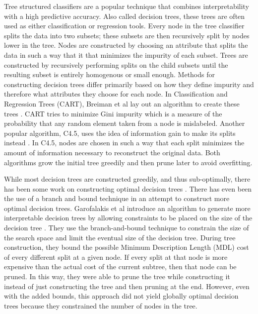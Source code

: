 \documentclass[]{report}
\theoremstyle{definition}
\begin{document}
Tree structured classifiers are a popular technique that combines interpretability with a high predictive accuracy.
Also called decision trees, these trees are often used as either classification or regression tools.
Every node in the tree classifier splits the data into two subsets; these subsets are then recursively split by nodes lower in the tree.
Nodes are constructed by choosing an attribute that splits the data in such a way that it that minimizes the impurity of each subset.
Trees are constructed by recursively performing splits on the child subsets until the resulting subset is entirely homogenous or small enough.
Methods for constructing decision trees differ primarily based on how they define impurity and therefore what attributes they choose for each node.
In Classification and Regression Trees (CART), Breiman et al lay out an algorithm to create these trees \cite{BreimanFrOlSt84}.
CART tries to minimize Gini impurity which is a measure of the probability that any random element taken from a node is mislabeled.
Another popular algorithm, C4.5, uses the idea of information gain to make its splits instead \cite{Quinlan93}.
In C4.5, nodes are chosen in such a way that each split minimizes the amount of information necessary to reconstruct the original data.
Both algorithms grow the initial tree greedily and then prune later to avoid overfitting.

While most decision trees are constructed greedily, and thus sub-optimally, there has been some work on constructing optimal decision trees \cite{Moret82}.
There has even been the use of a branch and bound technique in an attempt to construct more optimal decision trees.
Garofalakis et al introduce an algorithm to generate more interpretable decision trees by allowing constraints to be placed on the size of the decision tree \cite{GarofalakisHyRaSh00}.
They use the branch-and-bound technique to constrain the size of the search space and limit the eventual size of the decision tree.
During tree construction, they bound the possible Minimum Description Length (MDL) cost of every different split at a given node.
If every split at that node is more expensive than the actual cost of the current subtree, then that node can be pruned.
In this way, they were able to prune the tree while constructing it instead of just constructing the tree and then pruning at the end.
However, even with the added bounds, this approach did not yield globally optimal decision trees because they constrained the number of nodes in the tree.
\end{document}

